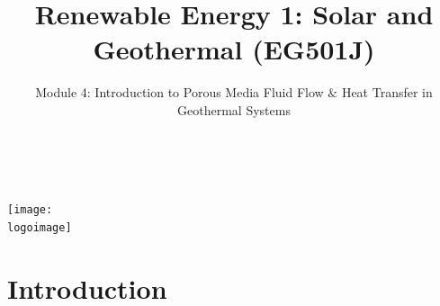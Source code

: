 \documentclass[10pt,compress]{beamer}
\institute{School of Engineering}
\title{Renewable Energy 1: Solar and Geothermal (EG501J)}
\subtitle{Module 4: Introduction to Porous Media Fluid Flow $\&$ Heat Transfer in Geothermal Systems}
\date[]{}
\author[\shortname]{%
  \fullname\\\ttfamily{\emailaddress}
}
\newcommand{\logoimage}{../FigBanner/UoAHorizBanner}
\begin{document}
\begin{frame}
  \titlepage
  \vfill%
  \begin{center}
    \texttt{[image: \\logoimage]}
  \end{center}
\end{frame}





\section{Introduction}

\end{document}
